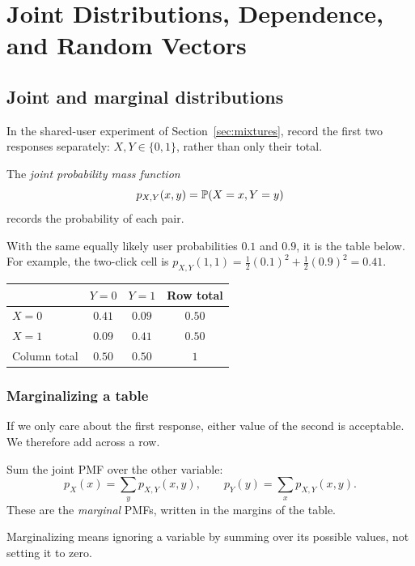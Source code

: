\chapter{Joint Distributions, Dependence, and Random Vectors}
\label{chap:joint-distributions}

\section{Joint and marginal distributions}
\label{sec:joint-tables}

In the shared-user experiment of Section~\ref{sec:mixtures}, record
the first two responses separately: \(X,Y\in\{0,1\}\), rather than
only their total.
\begin{definition}
The \emph{joint probability mass function}
\[
  p_{X,Y}(x,y)=\mathbb{P}(X=x,Y=y)
\]
records the probability of each pair.
\end{definition}
With the same equally likely
user probabilities \(0.1\) and \(0.9\), it is the table below. For
example, the two-click cell is
\(p_{X,Y}(1,1)=\tfrac12(0.1)^2+\tfrac12(0.9)^2=0.41\).

\begin{center}
\renewcommand{\arraystretch}{1.3}
\begin{tabular}{@{}lccc@{}}
\toprule
 & \(Y=0\) & \(Y=1\) & Row total\\
\midrule
\(X=0\) & \(0.41\) & \(0.09\) & \(0.50\)\\
\(X=1\) & \(0.09\) & \(0.41\) & \(0.50\)\\
\midrule
Column total & \(0.50\) & \(0.50\) & \(1\)\\
\bottomrule
\end{tabular}
\end{center}

\subsection{Marginalizing a table}

If we only care about the first response, either value of the second is
acceptable. We therefore add across a row.
\begin{result}
Sum the joint PMF over the other variable:
\begin{equation}
  p_X(x)=\sum_y p_{X,Y}(x,y),\qquad
  p_Y(y)=\sum_x p_{X,Y}(x,y).
  \label{eq:joint-marginals-discrete}
\end{equation}
These are the \emph{marginal} PMFs, written in the margins of the table.
\end{result}
Marginalizing means ignoring a variable by summing over its possible
values, not setting it to zero.

